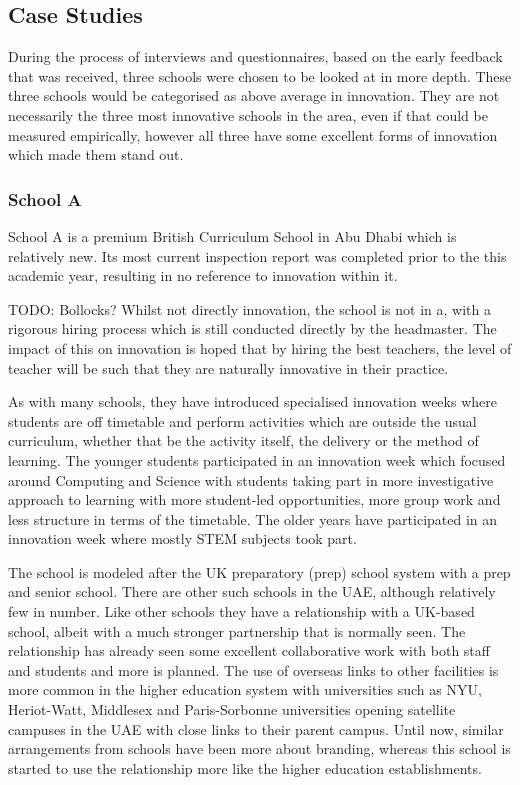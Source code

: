 \subsection{Case Studies}
During the process of interviews and questionnaires, based on the early feedback that was received, three schools were chosen to be looked at in more depth. These three schools would be categorised as above average in innovation. They are not necessarily the three most innovative schools in the area, even if that could be measured empirically, however all three have some excellent forms of innovation which made them stand out.

\subsubsection{School A}
School A is a premium British Curriculum School in Abu Dhabi which is relatively new. Its most current inspection report was completed prior to the this academic year, resulting in no reference to innovation within it.

TODO: Bollocks?
Whilst not directly innovation, the school is not in a, with a rigorous hiring process which is still conducted directly by the headmaster. The impact of this on innovation is hoped that by hiring the best teachers, the level of teacher will be such that they are naturally innovative in their practice.

As with many schools, they have introduced specialised innovation weeks where students are off timetable and perform activities which are outside the usual curriculum, whether that be the activity itself, the delivery or the method of learning. The younger students participated in an innovation week which focused around Computing and Science with students taking part in more investigative approach to learning with more student-led opportunities, more group work and less structure in terms of the timetable. The older years have participated in an innovation week where mostly STEM subjects took part.

The school is modeled after the UK preparatory (prep) school system with a prep and senior school. There are other such schools in the UAE, although relatively few in number. Like other schools they have a relationship with a UK-based school, albeit with a much stronger partnership that is normally seen. The relationship has already seen some excellent collaborative work with both staff and students and  more is planned. The use of overseas links to other facilities is more common in the higher education system with universities such as NYU, Heriot-Watt, Middlesex and Paris-Sorbonne universities opening satellite campuses in the UAE with close links to their parent campus. Until now, similar arrangements from schools have been more about branding, whereas this school is started to use the relationship more like the higher education establishments.

